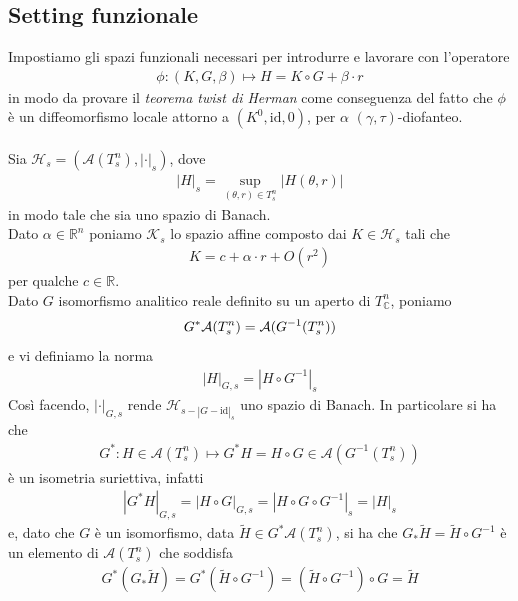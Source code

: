\documentclass[twoside, 11pt]{amsbook}
\newcommand{\0}{{(0)}}
\newcommand{\3}{{(3)}}
\theoremstyle{colonplain}
\theoremstyle{colondefinition}
\theoremstyle{colonremark}
\numberwithin{equation}{chapter}
\begin{document}
\subsection{Setting funzionale}
Impostiamo gli spazi funzionali necessari per introdurre e lavorare con l'operatore
\begin{align}
    \phi : (K, G, \beta) \mapsto H = K \circ G + \beta \cdot r 
\end{align}
in modo da provare il \textit{teorema twist di Herman} come conseguenza del fatto che $\phi$ è un diffeomorfismo locale attorno a $(K^0, \mathrm{id}, 0)$, per $\alpha$ $(\gamma, \tau)$-diofanteo. \\ \\
Sia $\mathcal{H}_s = (\mathcal{A}(T^n_s), |\cdot|_s)$, dove
\begin{align}
    |H|_s = \sup_{(\theta, r) \in T^n_s} |H(\theta, r)| 
\end{align}
in modo tale che sia uno spazio di Banach. \\
Dato $\alpha \in \mathbb{R}^n$ poniamo $\mathcal{K}_s$ lo spazio affine composto dai $K \in \mathcal{H}_s$ tali che
\begin{align}
    K = c + \alpha \cdot r + O(r^2) 
\end{align}
per qualche $c \in \mathbb{R}$. \\
Dato $G$ isomorfismo analitico reale definito su un aperto di $T^n_{\mathbb{C}}$, poniamo
\begin{align}
    G^*\mathcal{A}(T^n_s) = \mathcal{A}(G^{-1}(T^n_s)) \notag
\end{align}
e vi definiamo la norma
\begin{align}
    |H|_{G, s} = |H \circ G^{-1}|_s 
\end{align}
Così facendo, $|\cdot|_{G, s}$ rende $\mathcal{H}_{s - |G - \mathrm{id}|_s}$ uno spazio di Banach. In particolare si ha che
\begin{align}
    G^* : H \in \mathcal{A}(T^n_s) \mapsto G^*H = H \circ G \in \mathcal{A}(G^{-1}(T^n_s)) 
\end{align}
è un isometria suriettiva, infatti
\begin{align}
    |G^*H|_{G, s} = |H \circ G|_{G, s} = |H \circ G \circ G^{-1}|_s = |H|_s
\end{align}
e, dato che $G$ è un isomorfismo, data $\widetilde{H} \in G^*\mathcal{A}(T^n_s)$, si ha che $G_*\widetilde{H} = \widetilde{H} \circ G^{-1}$ è un elemento di $\mathcal{A}(T^n_s)$ che soddisfa
\begin{align}
    G^*(G_*\widetilde{H}) = G^*(\widetilde{H} \circ G^{-1}) = (\widetilde{H} \circ G^{-1}) \circ G = \widetilde{H}
\end{align}
\end{document}
